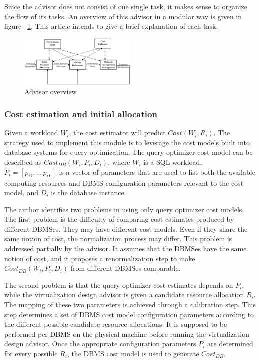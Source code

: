 \documentclass[jidm,a4paper]{jidm} %
\begin{document}
Since the advisor does not consist of one single task, it makes sense to organize the flow of its tasks. An overview of this advisor in a modular way is given in figure ~\ref{fig:architecture}. This article intends to give a brief explanation of each task.


\begin{figure}[t]
\centering
\includegraphics[width=0.5\textwidth]{architecture.eps}
\caption{Advisor overview}
\label{fig:architecture}
\end{figure} 

\subsubsection{Cost estimation and initial allocation}
\label{subsec:cost}

Given a workload $W_{i}$, the cost estimator will predict $Cost(W_{i},R_{i})$. The strategy used to implement this module is to leverage the cost models built into database systems for query optimization. The query optimizer cost model can be described as $Cost_{DB}(W_{i},P_{i},D_{i})$, where $W_{i}$ is a SQL workload, $P_{i} = [p_{i1},..,p_{iL}]$ is a vector of parameters that are used to list both the available computing resources and DBMS configuration parameters relevant to the cost model, and $D_{i}$ is  the database instance. 

The author identifies two problems in using only query optimizer cost models. The first problem is the difficulty of comparing cost estimates produced by different DBMSes. They may have different cost models. Even if they share the same notion of cost, the normalization process may differ. This problem is addressed partially by the advisor. It assumes that the DBMSes have the same notion of cost, and it proposes a renormalization step to make $Cost_{DB}(W_{i},P_{i},D_{i})$ from different DBMSes comparable.%

The second problem is that the query optimizer cost estimates depends on $P_{i}$, while the virtualization design advisor is given a candidate resource allocation $R_{i}$. The mapping of these two parameters is achieved through a calibration step. This step determines a set of DBMS cost model configuration parameters according to the different possible candidate resource allocations. It is supposed to be performed per DBMS on the physical machine before running the virtualization design advisor. Once the appropriate configuration parameters $P_{i}$ are determined for every possible $R_{i}$, the DBMS cost model is used to generate $Cost_{DB}$.
\end{document}
